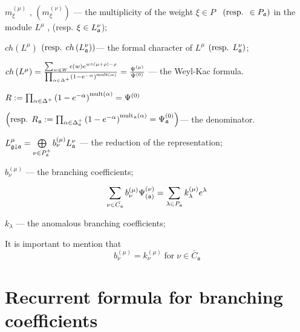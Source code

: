 \documentclass[a4paper,12pt]{article}
\theoremstyle{definition} \newtheorem{Def}{Definition}
\begin{document}
$m_{\xi }^{\left( \mu \right) }$ , $\left( m_{\xi }^{\left( \nu \right)
}\right) $ --- the multiplicity of the weight $\xi \in P$ \ $\left( \text{%
resp. }\in P_{\frak{a}}\right) $ in the module $L^{\mu }$ , (resp. $\xi \in
L_{\frak{a}}^{\nu } $);

$ch\left( L^{\mu }\right) $ $\left( \text{resp. }ch\left( L_{\frak{a}}^{\nu
}\right) \right) $--- the formal character of $L^{\mu }$ $\left( \text{resp. }%
L_{\frak{a}}^{\nu }\right) $;

$ch\left( L^{\mu }\right) =\frac{\sum_{w\in W}\epsilon (w)e^{w\circ (\mu
+\rho )-\rho }}{\prod_{\alpha \in \Delta ^{+}}\left( 1-e^{-\alpha }\right) ^{%
\mathrm{{mult}\left( \alpha \right) }}}=\frac{\Psi ^{\left( \mu \right) }}{%
\Psi ^{\left( 0\right) }}$ --- the Weyl-Kac formula.

$R:=\prod_{\alpha \in \Delta ^{+}}\left( 1-e^{-\alpha }\right) ^{\mathrm{{%
mult}\left( \alpha \right) }}=\Psi ^{\left( 0\right) }\quad $

\noindent $\left( \text{resp. }R_{\frak{a}}:=\prod_{\alpha \in \Delta _{%
\frak{a}}^{+}}\left( 1-e^{-\alpha }\right) ^{\mathrm{mult}_{\frak{a}}\mathrm{%
\left( \alpha \right) }}=\Psi _{\frak{a}}^{\left( 0\right) }\right) $--- the
denominator.

$  L_{\frak{g}\downarrow \frak{a}}^{\mu }=\bigoplus\limits_{\nu \in P_{\frak{a}}^{+}}b_{\nu }^{\left( \mu \right) }L_{\frak{a}}^{\nu }$ --- the reduction of the representation;


$b^{(\mu)}_{\nu}$ --- the branching coefficients;

\begin{equation}
  \label{eq:21}
  \sum_{\nu \in \bar{C_{\mathfrak{a}}}}b_{\nu }^{\left( \mu \right) }\Psi _{\left( \frak{%
        a}\right) }^{\left( \nu \right) }=\sum_{\lambda \in P_{\frak{a}}}k_{\lambda
  }^{\left( \mu \right) }e^{\lambda } 
\end{equation}

 $k_{\lambda}$ --- the anomalous branching coefficients;

It is important to mention that
\begin{equation}
  \label{eq:20}
  b^{(\mu)}_{\nu}=k^{(\mu)}_{\nu} \; \mbox{for} \; \nu\in \bar{C}_{\mathfrak{a}}
\end{equation}

\section{Recurrent formula for branching coefficients}
\label{sec:recurr-form-branch}
\end{document}
